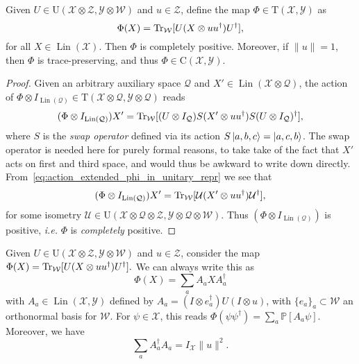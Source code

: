 \documentclass[12pt]{report}
\newcommand{\PP}{\mathbb{P}}
\newcommand{\calY}{{\mathcal{Y}}}
\newcommand{\calQ}{{\mathcal{Q}}}
\newcommand{\calU}{{\mathcal{U}}}
\newcommand{\calW}{{\mathcal{W}}}
\newcommand{\calX}{{\mathcal{X}}}
\newcommand{\calZ}{{\mathcal{Z}}}
\newcommand{\rmC}{{\mathrm{C}}}
\newcommand{\rmT}{{\mathrm{T}}}
\newcommand{\rmU}{{\mathrm{U}}}
\DeclareMathOperator{\Lin}{Lin}
\begin{document}
\begin{prop}
	Given $U\in\rmU(\calX\otimes\calZ,\calY\otimes\calW)$ and $u\in\calZ$, define the map $\Phi\in\rmT(\calX,\calY)$ as
	\begin{equation}
		\Phi(X) = \Tr_\calW[U(X\otimes uu^\dagger)U^\dagger],
	\end{equation}
	for all $X\in\Lin(\calX)$.
	Then $\Phi$ is completely positive.
	Moreover, if $\|u\|=1$, then $\Phi$ is trace-preserving, and thus $\Phi\in\rmC(\calX,\calY)$.
\end{prop}
\begin{proof}
	Given an arbitrary auxiliary space $\calQ$ and $X'\in\Lin(\calX\otimes\calQ)$, the action of
	$\Phi\otimes I_{\Lin(\calQ)}\in\rmT(\calX\otimes\calQ,\calY\otimes\calQ)$ reads
	\begin{equation}\label{eq:action_extended_phi_in_unitary_repr}
		(\Phi\otimes I_{\Lin(\calQ)})X'
		= \Tr_\calW[(U\otimes I_\calQ) S(X'\otimes uu^\dagger)S (U\otimes I_\calQ)^\dagger ],
	\end{equation}
	where $S$ is the \emph{swap operator} defined via its action
	$S\ket{a,b,c} = \ket{a,c,b}$.
	The swap operator is needed here for purely formal reasons, to take take of the fact that $X'$ acts on first and third space, and would thus be awkward to write down directly.
	From~\cref{eq:action_extended_phi_in_unitary_repr} we see that
	\begin{equation}
		(\Phi\otimes I_{\Lin(\calQ)})X' = \Tr_\calW[\calU (X'\otimes uu^\dagger)\calU^\dagger],
	\end{equation}
	for some isometry $\calU\in\rmU(\calX\otimes\calQ\otimes\calZ,\calY\otimes\calQ\otimes\calW)$.
	Thus $(\Phi\otimes I_{\Lin(\calQ)})$ is positive, \emph{i.e.} $\Phi$ is \emph{completely} positive.
\end{proof}

\begin{prop}
	Given $U\in\rmU(\calX\otimes\calZ,\calY\otimes\calW)$ and $u\in\calZ$, consider the map
		$\Phi(X) = \Tr_\calW[U(X\otimes uu^\dagger)U^\dagger].$
	We can always write this as
	\begin{equation}
		\Phi(X) = \sum_{a} A_a X A_a^\dagger
	\end{equation}
	with $A_a\in\Lin(\calX,\calY)$ defined by
	$A_a = (I \otimes e_a^\dagger)U(I \otimes u)$,
	with $\{e_a\}_a\subset\calW$ an orthonormal basis for $\calW$.
	For $\psi\in\calX$, this reads
	$\Phi(\psi\psi^\dagger) = \sum_a \PP[A_a \psi]$.
	Moreover, we have
	\begin{equation}
		\sum_a A_a^\dagger A_a = I_{\calX} \|u\|^2.
	\end{equation}
\end{prop}
\end{document}
